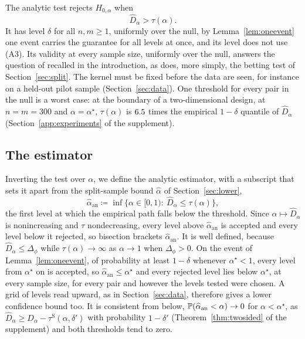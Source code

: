 The analytic test rejects $H_{0,\alpha}$ when
\begin{equation}
\widehat D_\alpha>\tau(\alpha) .
\label{eq:test}
\end{equation}
It has level $\delta$ for all $n,m\ge1$, uniformly over the null, by Lemma~\ref{lem:oneevent} one event carries the
guarantee for all levels at once, and its level does not use (A3). Its validity at every sample size, uniformly over the null, answers
the question of \citet{alvarez2012similarity} recalled in the introduction, as does, more simply, the betting test of
Section~\ref{sec:split}. The kernel must be fixed before the data are seen, for instance on a held-out pilot sample
(Section~\ref{sec:data}). One threshold for every pair in the null is a worst case: at the boundary of a
two-dimensional design, at $n=m=300$ and $\alpha=\alpha^\star$, $\tau(\alpha)$ is $6.5$ times the
empirical $1-\delta$ quantile of $\widehat D_\alpha$ (Section~\ref{app:experiments} of the supplement).

\subsection{The estimator}
\label{sec:alpha}

Inverting the test over $\alpha$, we define the analytic estimator, with a subscript that sets it apart from the
split-sample bound $\widehat\alpha$ of Section~\ref{sec:lower},
\begin{equation}
\widehat\alpha_{\mathrm{an}}\coloneqq\inf\big\{\alpha\in[0,1):\ \widehat D_\alpha\le\tau(\alpha)\big\} ,
\label{eq:alphaest}
\end{equation}
the first level at which the empirical path falls below the threshold. Since $\alpha\mapsto\widehat D_\alpha$ is
nonincreasing and $\tau$ nondecreasing, every level above $\widehat\alpha_{\mathrm{an}}$ is accepted and every level below it rejected,
so bisection brackets $\widehat\alpha_{\mathrm{an}}$. It is well defined, because
$\widehat D_\alpha\le \Delta_\phi$ while $\tau(\alpha)\to\infty$ as $\alpha\to1$ when $\Delta_\phi>0$. On the event of
Lemma~\ref{lem:oneevent}, of probability at least $1-\delta$ whenever $\alpha^\star<1$, every level from $\alpha^\star$
on is accepted, so $\widehat\alpha_{\mathrm{an}}\le\alpha^\star$ and every rejected level lies below $\alpha^\star$, at every sample
size, for every pair and however the levels tested were chosen. A grid of levels read upward, as in
Section~\ref{sec:data}, therefore gives a lower confidence bound too. It is consistent from below,
$\mathbb{P}(\widehat\alpha_{\mathrm{an}}<\alpha)\to0$ for $\alpha<\alpha^\star$, as $\widehat D_\alpha\ge
D_\alpha-\tau^{\mathrm S}(\alpha,\delta')$ with probability $1-\delta'$ (Theorem~\ref{thm:twosided} of the supplement)
and both thresholds tend to zero.

